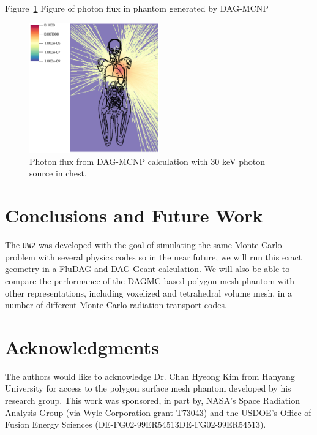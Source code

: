 \documentclass{anstrans}
\begin{document}
Figure~\ref{fig:mcnp} Figure of photon flux in phantom generated by DAG-MCNP
\begin{figure}[ht] %
  \centering
  \includegraphics[width=0.5\textwidth]{../figs/30KeV_Psource.png}
  \caption{Photon flux from DAG-MCNP calculation with 30 keV photon source in chest. }
  \label{fig:mcnp}
\end{figure}


\section{Conclusions and Future Work}

The \texttt{UW2} was developed with the goal of simulating the same Monte
Carlo problem with several physics codes so in the near future, we will run
this exact geometry in a FluDAG and DAG-Geant calculation. We will also be
able to compare the performance of the DAGMC-based polygon mesh phantom with
other representations, including voxelized and tetrahedral volume mesh, in a
number of different Monte Carlo radiation transport codes.

\section{Acknowledgments}

The authors would like to acknowledge Dr. Chan Hyeong Kim from Hanyang University for access to the polygon surface mesh phantom developed by his research group.  This work was sponsored, in part by, NASA's Space Radiation Analysis Group (via Wyle Corporation grant T73043) and the USDOE's Office of Fusion Energy Sciences (DE-FG02-99ER54513DE-FG02-99ER54513).



\end{document}
